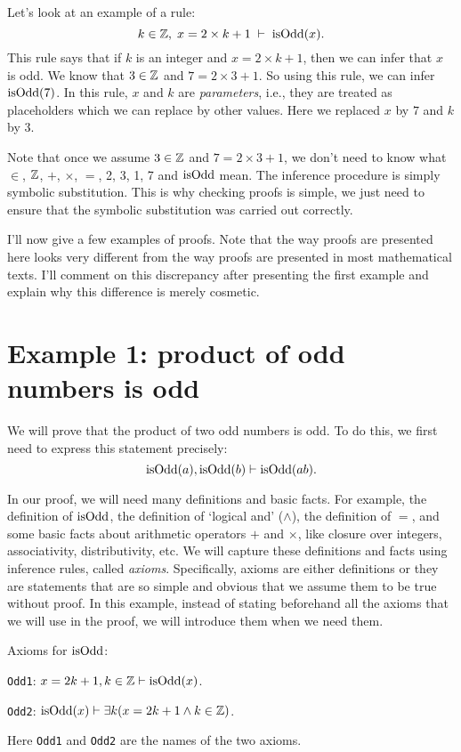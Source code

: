 Let's look at an example of a rule:
\[ k \in \mathbb{Z},\; x = 2 \times k + 1\; \vdash\; \operatorname{isOdd}(x). \]
This rule says that if $k$ is an integer and $x = 2 \times k + 1$,
then we can infer that $x$ is odd.
We know that $3 \in \mathbb{Z}$ and $7 = 2 \times 3 + 1$.
So using this rule, we can infer $\operatorname{isOdd}(7)$.
In this rule, $x$ and $k$ are \emph{parameters}, i.e.,
they are treated as placeholders which we can replace by other values.
Here we replaced $x$ by $7$ and $k$ by $3$.

Note that once we assume $3 \in \mathbb{Z}$ and $7 = 2 \times 3 + 1$,
we don't need to know what $\in$, $\mathbb{Z}$, $+$, $\times$, $=$, 2, 3, 1, 7 and $\operatorname{isOdd}$ mean.
The inference procedure is simply symbolic substitution.
This is why checking proofs is simple, we just need to ensure
that the symbolic substitution was carried out correctly.

I'll now give a few examples of proofs.
Note that the way proofs are presented here looks very different from
the way proofs are presented in most mathematical texts.
I'll comment on this discrepancy after presenting the first example
and explain why this difference is merely cosmetic.

\section{Example 1: product of odd numbers is odd}

We will prove that the product of two odd numbers is odd.
To do this, we first need to express this statement precisely:
\[ \operatorname{isOdd}(a), \operatorname{isOdd}(b) \vdash \operatorname{isOdd}(ab). \]

In our proof, we will need many definitions and basic facts.
For example, the definition of $\operatorname{isOdd}$, the definition of `logical and' ($\land$),
the definition of $=$, and some basic facts about arithmetic operators $+$ and $\times$,
like closure over integers, associativity, distributivity, etc.
We will capture these definitions and facts using inference rules, called \emph{axioms}.
Specifically, axioms are either definitions or they are statements that are
so simple and obvious that we assume them to be true without proof.
In this example, instead of stating beforehand all the axioms that we will use in the proof,
we will introduce them when we need them.

Axioms for $\operatorname{isOdd}$:
\begin{tightemize}
\item \texttt{Odd1}: $x = 2k+1, k \in \mathbb{Z} \vdash \operatorname{isOdd}(x)$.
\item \texttt{Odd2}: $\operatorname{isOdd}(x) \vdash \exists k (x = 2k+1 \land k \in \mathbb{Z})$.
\end{tightemize}
Here \texttt{Odd1} and \texttt{Odd2} are the names of the two axioms.

